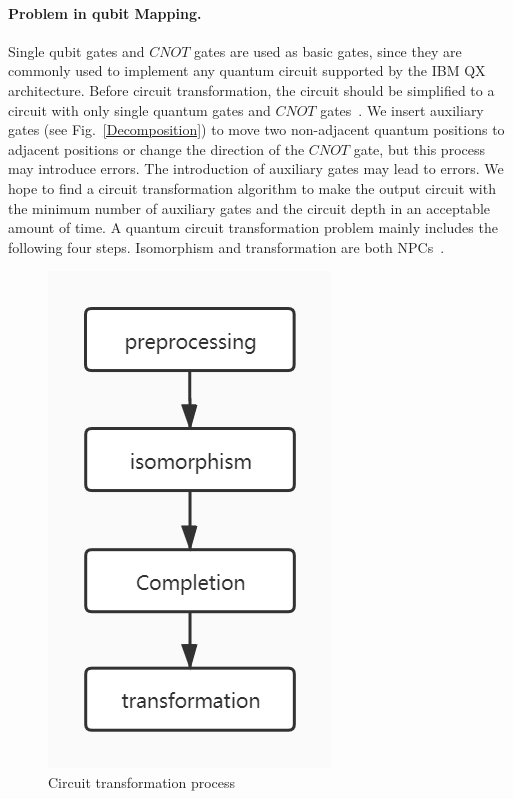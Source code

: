 \documentclass[runningheads]{llncs}
\begin{document}
\paragraph{Problem in qubit Mapping.}
Single qubit gates and $CNOT$ gates are used as basic gates, since they are commonly used to implement any quantum circuit supported by the IBM QX architecture. Before circuit transformation, the circuit should be simplified to a circuit with only single quantum gates and $CNOT$ gates~\cite{2005Mttnen,1995Barenco}. We insert auxiliary gates (see Fig.~\ref{Decomposition}) to move two non-adjacent quantum positions to adjacent positions or change the direction of the $CNOT$ gate, but this process may introduce errors. The introduction of auxiliary gates may lead to errors. We hope to find a circuit transformation algorithm to make the output circuit with the minimum number of auxiliary gates and the circuit depth in an acceptable amount of time.
A quantum circuit transformation problem mainly includes the following four steps. Isomorphism and transformation are both NPCs~\cite{2018QubitSiraichi}.
\begin{figure}[h!] 
	\centering
	\includegraphics[scale=0.4]{uml.jpg}		 
	\caption{Circuit transformation process}
	\label{processing}	
	 \end{figure}
\end{document}
